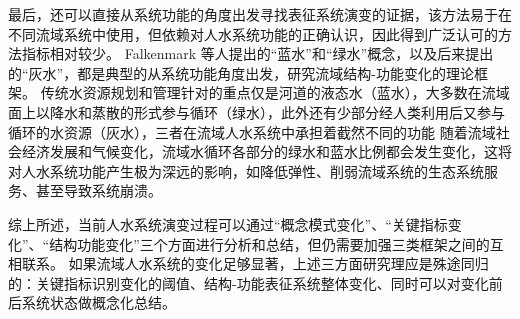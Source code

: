 最后，还可以直接从系统功能的角度出发寻找表征系统演变的证据，该方法易于在不同流域系统中使用，但依赖对人水系统功能的正确认识，因此得到广泛认可的方法指标相对较少。
Falkenmark 等人提出的“蓝水”和“绿水”概念\cite{falkenmark2006}，以及后来提出的“灰水”，都是典型的从系统功能角度出发，研究流域结构-功能变化的理论框架。 %
传统水资源规划和管理针对的重点仅是河道的液态水（蓝水），大多数在流域面上以降水和蒸散的形式参与循环（绿水），此外还有少部分经人类利用后又参与循环的水资源（灰水），三者在流域人水系统中承担着截然不同的功能\cite{craswell2007}
随着流域社会经济发展和气候变化，流域水循环各部分的绿水和蓝水比例都会发生变化，这将对人水系统功能产生极为深远的影响，如降低弹性、削弱流域系统的生态系统服务、甚至导致系统崩溃\cite{falkenmark2019}。

综上所述，当前人水系统演变过程可以通过“概念模式变化”、“关键指标变化”、“结构功能变化”三个方面进行分析和总结，但仍需要加强三类框架之间的互相联系。
如果流域人水系统的变化足够显著，上述三方面研究理应是殊途同归的：关键指标识别变化的阈值、结构-功能表征系统整体变化、同时可以对变化前后系统状态做概念化总结。
